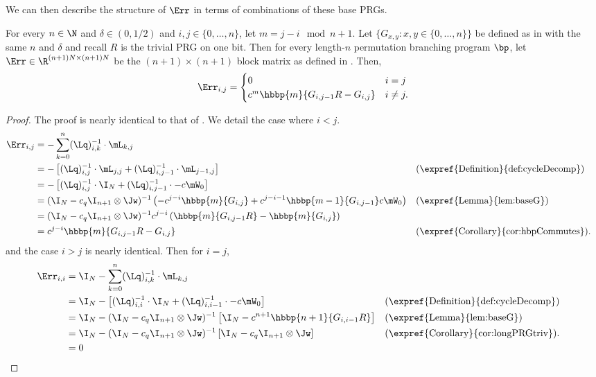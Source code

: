 \documentclass{toc}
\begin{document}
We can then describe the structure of $\Err$ in terms of combinations of these base PRGs.
\begin{lemma}\label{lem:errStruct}
For every $n\in\N$ and $\delta \in (0,1/2)$ and $i,j\in \{0,\ldots,n\}$, let $m=j-i\mod n+1$. Let $\{G_{x,y}:x,y\in\{0,\dots,n\}\}$ be defined as in  with the same $n$ and $\delta$ and recall $R$ is the trivial PRG on one bit. Then for every length-$n$ permutation branching program $\bp$, let $\Err\in \R^{(n+1)N\times (n+1)N}$ be the $(n+1)\times(n+1)$ block matrix as defined in . Then,
\[\Err_{i,j}=\begin{cases}
0 & i=j\\
c^{m}\hbbp{m}{G_{i,j-1}R-G_{i,j}} & i\neq j.
\end{cases}\]
\end{lemma}
\begin{proof}
The proof is nearly identical to that of . We detail the case where $i<j$. %
\begin{align*}
    \Err_{i,j} &= -\sum_{k=0}^{n}(\Lq)^{-1}_{i,k}\cdot \mL_{k,j}\\
    &= -\left[(\Lq)^{-1}_{i,j}\cdot\mL_{j,j}+(\Lq)^{-1}_{i,j-1}\cdot\mL_{j-1,j}\right] && \text{(\expref{Definition}{def:cycleDecomp})}\\
    &= -\left[(\Lq)^{-1}_{i,j}\cdot\I_{N}+(\Lq)^{-1}_{i,j-1}\cdot-c\mW_0\right]\\
    &=  (\I_N-c_q\I_{n+1}\otimes\Jw)^{-1}\left(-c^{j-i}\hbbp{m}{G_{i,j}} + c^{j-i-1}\hbbp{m-1}{G_{i,j-1}}c\mW_0\right) && \text{(\expref{Lemma}{lem:baseG})}\\
    &= (\I_N-c_q\I_{n+1}\otimes\Jw)^{-1}c^{j-i}\left(\hbbp{m}{G_{i,j-1}R}-\hbbp{m}{G_{i,j}}\right)\\
    &= c^{j-i}\hbbp{m}{G_{i,j-1}R-G_{i,j}} && \text{(\expref{Corollary}{cor:hbpCommutes}).}
\end{align*}
and the case $i>j$ is nearly identical. Then for $i=j$,
\begin{align*}
    \Err_{i,i} &= \I_N-\sum_{k=0}^{n}(\Lq)^{-1}_{i,k}\cdot \mL_{k,j}\\
    &= \I_N -\left[(\Lq)^{-1}_{i,i}\cdot\I_{N}+(\Lq)^{-1}_{i,i-1}\cdot-c\mW_0\right] && \text{(\expref{Definition}{def:cycleDecomp})}\\ 
    &= \I_N -(\I_N-c_q\I_{n+1}\otimes\Jw)^{-1}\left[\I_N-c^{n+1}\hbbp{n+1}{G_{i,i-1}R}\right]&& \text{(\expref{Lemma}{lem:baseG})}\\
    &= \I_N-(\I_N-c_q\I_{n+1}\otimes\Jw)^{-1}\left[\I_N-c_q\I_{n+1}\otimes\Jw\right] && \text{(\expref{Corollary}{cor:longPRGtriv}).}\\
    &= 0 && \qedhere
\end{align*}
\end{proof}
\end{document}
